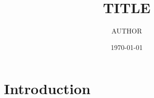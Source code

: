 \documentclass[draft]{article}
\title{TITLE}
\author{AUTHOR}
\date{\today}
\begin{document}
\tableofcontents

\listoffigures

\listoftables

\clearpage
\section{Introduction}
\label{sec:introduction}
\end{document}
